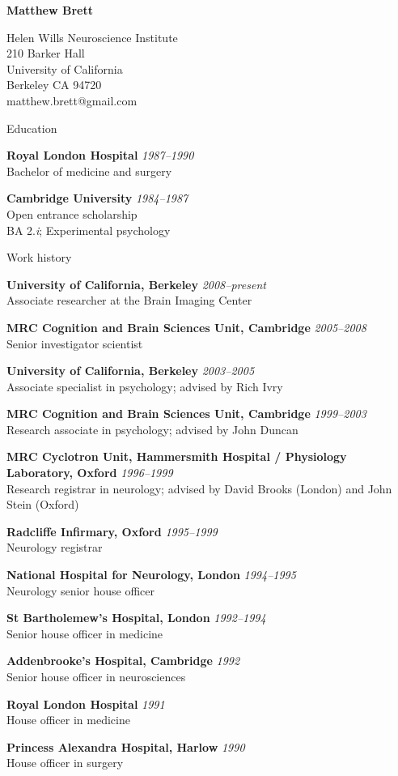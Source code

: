 \documentclass{cv}
\newcommand{\PlaceDate}[2]{{\bf #1} \hfill {\em #2} \\}
\newcommand{\PlaceDateNote}[3]{{\bf #1} \hfill {\em #2} \\#3}
\newcommand{\UCB}{University of California, Berkeley}
\newcommand{\CBU}{MRC Cognition and Brain Sciences Unit, Cambridge}
\begin{document}
\nocite{*}

{\huge \bf Matthew Brett}

Helen Wills Neuroscience Institute \\
210 Barker Hall \\
University of California \\
Berkeley CA 94720 \\
matthew.brett@gmail.com

\begin{cvSection}{Education}

\PlaceDate{Royal London Hospital}{1987--1990 }
Bachelor of medicine and surgery

\PlaceDateNote{Cambridge University}{1984--1987 }{
Open entrance scholarship \\
BA 2.{\em i}; Experimental psychology}

\end{cvSection}

\begin{cvSection}{Work history}

\PlaceDateNote{\UCB}{2008--present }{
Associate researcher at the Brain Imaging Center}

\PlaceDateNote{\CBU}{2005--2008}{
Senior investigator scientist}

\PlaceDateNote{\UCB}{2003--2005 }{
Associate specialist in psychology; advised by Rich Ivry}

\PlaceDateNote{\CBU}{1999--2003 }{
Research associate in psychology; advised by John Duncan}

\PlaceDateNote{
MRC Cyclotron Unit, Hammersmith Hospital / Physiology Laboratory, Oxford}
{1996--1999}
{Research registrar in neurology; advised by David Brooks (London) and John
Stein (Oxford)}

\PlaceDateNote{Radcliffe Infirmary, Oxford}
{1995--1999}
{Neurology registrar}

\PlaceDateNote{National Hospital for Neurology, London}{1994--1995 }{
Neurology senior house officer}

\PlaceDateNote{St Bartholemew's Hospital, London}{1992--1994 }{
Senior house officer in medicine}

\PlaceDateNote{Addenbrooke's Hospital, Cambridge}{1992 }{
Senior house officer in neurosciences}

\PlaceDateNote{Royal London Hospital}{1991 }{
House officer in medicine}

\PlaceDateNote{Princess Alexandra Hospital, Harlow}{1990 }{
House officer in surgery}

\end{cvSection}
\end{document}
